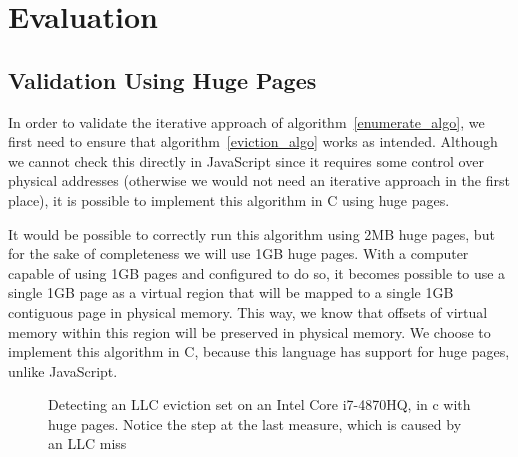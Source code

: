\documentclass[a4paper,11pt,oneside]{report}
\begin{document}
\chapter{Evaluation}



\section{Validation Using Huge Pages}

In order to validate the iterative approach of algorithm~\ref{enumerate_algo}, we first need to ensure that algorithm~\ref{eviction_algo} works as intended. Although we cannot check this directly in JavaScript since it requires some control over physical addresses (otherwise we would not need an iterative approach in the first place), it is possible to implement this algorithm in C using huge pages.

It would be possible to correctly run this algorithm using 2MB huge pages, but for the sake of completeness we will use 1GB huge pages. With a computer capable of using 1GB pages and configured to do so, it becomes possible to use a single 1GB page as a virtual region that will be mapped to a single 1GB contiguous page in physical memory. This way, we know that offsets of virtual memory within this region will be preserved in physical memory. We choose to implement this algorithm in C, because this language has support for huge pages, unlike JavaScript.

\begin{figure}
    \centering
    \caption{Detecting an LLC eviction set on an Intel Core i7-4870HQ, in c with huge pages. Notice the step at the last measure, which is caused by an LLC miss}
    \label{fig:4870_eviction_c}
\end{figure}
\end{document}
